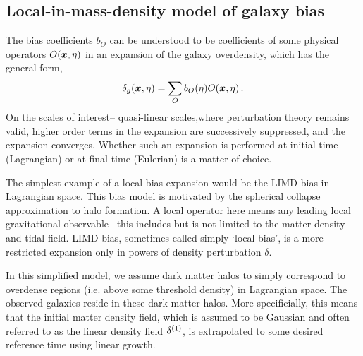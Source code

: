 \subsection{Local-in-mass-density model of galaxy bias}

The bias coefficients $b_O$ can be understood to be coefficients of some physical operators $O(\bm {x},\eta)$ in an expansion of the galaxy overdensity, which has the general form,
\begin{equation}
	\delta_g(\bm {x},\eta) = \sum_O b_O(\eta) O(\bm {x},\eta)\,.
\end{equation}
On the scales of interest-- quasi-linear scales,where perturbation theory remains valid, higher order terms in the expansion are successively suppressed, and the expansion converges. Whether such an expansion is performed at initial time (Lagrangian) or at final time (Eulerian) is a matter of choice.

The simplest example of a local bias expansion would be the LIMD bias in Lagrangian space. This bias model is motivated by the spherical collapse approximation to halo formation. A local operator here means any leading local gravitational observable-- this includes but is not limited to the matter density and tidal field. LIMD bias, sometimes called simply `local bias', is a more restricted expansion only in powers of density perturbation $\delta$.

In this simplified model, we assume dark matter halos to simply correspond to overdense regions (i.e. above some threshold density) in Lagrangian space. The observed galaxies reside in these dark matter halos. More specificially, this means that the initial matter density field, which is assumed to be Gaussian and often referred to as the linear density field $\delta^{(1)}$, is extrapolated to some desired reference time using linear growth. 

